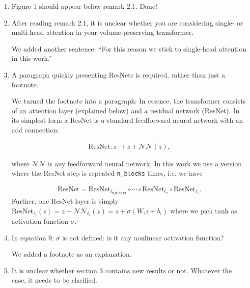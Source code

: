 \documentclass{article}
\begin{document}
\begin{enumerate}
\item Figure 1 should appear below remark 2.1.
    {\color{mred} Done!}
\item After reading remark 2.1, it is unclear whether you are considering single- or multi-head attention in your volume-preserving transformer.

    {\color{mred} We added another sentence: ``For this reason we stick to single-head attention in this work.''}
\item A paragraph quickly presenting ResNets is required, rather than just a footnote.

    {\color{mred} We turned the footnote into a paragraph:
    In essence, the transformer consists of an attention layer (explained below) and a residual network (ResNet). In its simplest form a ResNet is a standard feedforward neural network with an add connection:

    \begin{equation}
    \begin{split}\mathrm{ResNet}: z \rightarrow z + \mathcal{NN}(z),\end{split}\end{equation}

    where \(\mathcal{NN}\) is any feedforward neural network. In this work we use a version where the ResNet step is repeated \texttt{n\_blocks} times, i.e. we have

    \begin{equation}
    \begin{split}    \mathrm{ResNet} = \mathrm{ResNet}_{\ell_\mathtt{n\_blocks}}\circ\cdots\circ\mathrm{ResNet}_{\ell_2}\circ\mathrm{ResNet}_{\ell_1}.\end{split}\end{equation}
    Further, one ResNet layer is simply \(\mathrm{ResNet}_{\ell_i}(z) = z + \mathcal{NN}_{\ell_i}(z) = z + \sigma(W_iz + b_i)\) where we pick tanh as activation function \(\sigma.\) }

\item In equation 9, $\sigma$ is not defined: is it any nonlinear activation function?

        {\color{mred} We added a footnote as an explanation.}
\item It is unclear whether section 3 contains new results or not. Whatever the case, it needs to be clarified.


\end{enumerate}
\end{document}
